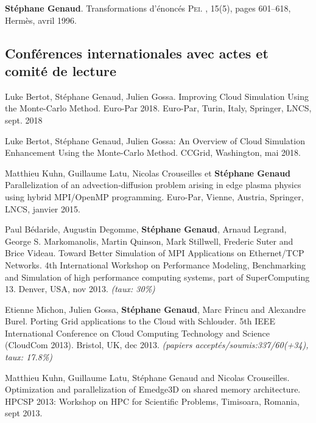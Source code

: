 \begin{thebibliography}{99}
\textbf{Stéphane Genaud}.
\newblock Transformations d'énoncés \textsc{Pei}.
, 15(5), pages 601--618, 
Hermès, avril 1996.


\subsection*{Conférences internationales avec actes et comité de lecture}

Luke Bertot, Stéphane Genaud, Julien Gossa.
\newblock Improving Cloud Simulation Using the Monte-Carlo Method. Euro-Par 2018.
\newblock Euro-Par, Turin, Italy, Springer, LNCS, sept. 2018 

Luke Bertot, Stéphane Genaud, Julien Gossa:
\newblock An Overview of Cloud Simulation Enhancement Using the Monte-Carlo Method. 
\newblock CCGrid, Washington, mai 2018.



Matthieu Kuhn, Guillaume Latu, Nicolas Crouseilles et \textbf{Stéphane Genaud}
\newblock Parallelization of an advection-diffusion problem arising in edge plasma physics using hybrid MPI/OpenMP programming.
\newblock Euro-Par, Vienne, Austria, Springer, LNCS, janvier 2015.

  Paul  Bédaride,  Augustin Degomme,  \textbf{Stéphane  Genaud},
  Arnaud  Legrand,  George  S.  Markomanolis, Martin  Quinson,  Mark  Stillwell,
  Frederic Suter  and Brice Videau.   
\newblock Toward Better Simulation  of MPI
  Applications on  Ethernet/TCP Networks.  
\newblock 4th  International Workshop
  on  Performance  Modeling, Benchmarking  and  Simulation  of high  performance
  computing  systems,  part  of  SuperComputing   13.  Denver,  USA,  nov  2013.
\newblock \small{\textit{(taux: 30\%)}}

Etienne Michon, Julien Gossa, \textbf{Stéphane Genaud}, Marc Frincu and Alexandre Burel.
\newblock Porting Grid applications to the Cloud with Schlouder.
\newblock 5th IEEE International Conference on Cloud Computing Technology and Science (CloudCom 2013). Bristol, UK, dec 2013.
\newblock \small{\textit{(papiers acceptés/soumis{:}337/60(+34), taux: 17.8\%)}}

Matthieu Kuhn, Guillaume Latu, Stéphane Genaud and Nicolas Crouseilles.
\newblock Optimization and parallelization of Emedge3D on shared memory architecture.
\newblock HPCSP 2013: Workshop on HPC for Scientific Problems, Timisoara, Romania, sept 2013.



\end{thebibliography}
